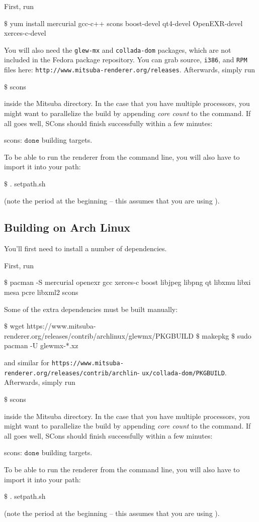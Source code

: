 First, run
\begin{shell}
$\text{\$}$ yum install mercurial gcc-c++ scons boost-devel qt4-devel OpenEXR-devel xerces-c-devel
\end{shell}
You will also need the \texttt{glew-mx} and \texttt{collada-dom} packages, which are not included in the Fedora package repository. 
You can grab source, \texttt{i386}, and  \texttt{RPM} files here: \texttt{http://www.mitsuba-renderer.org/releases}.
Afterwards, simply run
\begin{shell}
$\text{\$}$ scons
\end{shell}
inside the Mitsuba directory. In the case that you have multiple processors, you might want to parallelize the build by appending \emph{core count} to the command.
If all goes well, SCons should finish successfully within a few minutes:
\begin{shell}
scons: $\texttt{done}$ building targets.
\end{shell}
To be able to run the renderer from the command line, you will also have to import it into your path:
\begin{shell}
$\text{\$}$ . setpath.sh
\end{shell}
(note the period at the beginning -- this assumes that you are using ).

\subsection{Building on Arch Linux}
You'll first need to install a number of dependencies.

First, run
\begin{shell}
$\text{\$}$ pacman -S mercurial openexr gcc xerces-c boost libjpeg libpng qt libxmu libxi mesa pcre libxml2 scons
\end{shell}
Some of the extra dependencies must be built manually:
\begin{shell}
$\text{\$}$ wget https://www.mitsuba-renderer.org/releases/contrib/archlinux/glewmx/PKGBUILD
$\text{\$}$ makepkg
$\text{\$}$ sudo pacman -U glewmx-*.xz
\end{shell}
and similar for \texttt{https://www.mitsuba-renderer.org/releases/contrib/archlin}-
\texttt{ux/collada-dom/PKGBUILD}.
Afterwards, simply run
\begin{shell}
$\text{\$}$ scons
\end{shell}
inside the Mitsuba directory. In the case that you have multiple processors, you might want to parallelize the build by appending \emph{core count} to the command.
If all goes well, SCons should finish successfully within a few minutes:
\begin{shell}
scons: $\texttt{done}$ building targets.
\end{shell}
To be able to run the renderer from the command line, you will also have to import it into your path:
\begin{shell}
$\text{\$}$ . setpath.sh
\end{shell}
(note the period at the beginning -- this assumes that you are using ).



